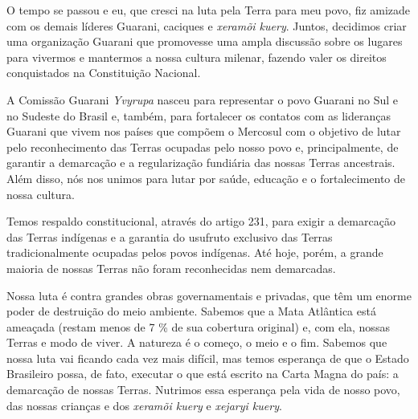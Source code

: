  


 

O tempo se passou e eu, que cresci na luta pela Terra para meu povo, fiz
amizade com os demais líderes Guarani, caciques e \emph{xeramõi kuery}.
Juntos, decidimos criar uma organização Guarani que promovesse uma ampla
discussão sobre os lugares para vivermos e mantermos a nossa cultura
milenar, fazendo valer os direitos conquistados na Constituição
Nacional.

A Comissão Guarani \emph{Yvyrupa} nasceu para representar o povo Guarani
no Sul e no Sudeste do Brasil e, também, para fortalecer os contatos com
as lideranças Guarani que vivem nos países que compõem o Mercosul com o
objetivo de lutar pelo reconhecimento das Terras ocupadas pelo nosso
povo e, principalmente, de garantir a demarcação e a regularização
fundiária das nossas Terras ancestrais. Além disso, nós nos unimos para
lutar por saúde, educação e o fortalecimento de nossa cultura.

Temos respaldo constitucional, através do artigo 231, para exigir a
demarcação das Terras indígenas e a garantia do usufruto exclusivo das
Terras tradicionalmente ocupadas pelos povos indígenas. Até hoje, porém,
a grande maioria de nossas Terras não foram reconhecidas nem demarcadas.

Nossa luta é contra grandes obras governamentais e privadas, que têm um
enorme poder de destruição do meio ambiente. Sabemos que a Mata
Atlântica está ameaçada (restam menos de 7 \% de sua cobertura original)
e, com ela, nossas Terras e modo de viver. A natureza é o começo, o meio
e o fim. Sabemos que nossa luta vai ficando cada vez mais difícil, mas
temos esperança de que o Estado Brasileiro possa, de fato, executar o
que está escrito na Carta Magna do país: a demarcação de nossas Terras.
Nutrimos essa esperança pela vida de nosso povo, das nossas crianças e
dos \emph{xeramõi kuery} e \emph{xejaryi kuery}.

 

 
